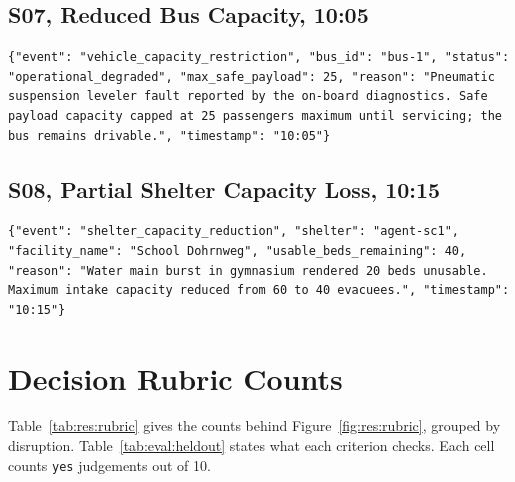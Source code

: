 \section{S07, Reduced Bus Capacity, 10:05}

\begin{lstlisting}[style=prompt]
{"event": "vehicle_capacity_restriction", "bus_id": "bus-1", "status": "operational_degraded", "max_safe_payload": 25, "reason": "Pneumatic suspension leveler fault reported by the on-board diagnostics. Safe payload capacity capped at 25 passengers maximum until servicing; the bus remains drivable.", "timestamp": "10:05"}
\end{lstlisting}

\section{S08, Partial Shelter Capacity Loss, 10:15}

\begin{lstlisting}[style=prompt]
{"event": "shelter_capacity_reduction", "shelter": "agent-sc1", "facility_name": "School Dohrnweg", "usable_beds_remaining": 40, "reason": "Water main burst in gymnasium rendered 20 beds unusable. Maximum intake capacity reduced from 60 to 40 evacuees.", "timestamp": "10:15"}
\end{lstlisting}

\chapter{Decision Rubric Counts}
\label{app:rubric}

Table~\ref{tab:res:rubric} gives the counts behind
Figure~\ref{fig:res:rubric}, grouped by disruption.
Table~\ref{tab:eval:heldout} states what each criterion checks. Each cell
counts \texttt{yes} judgements out of 10.

